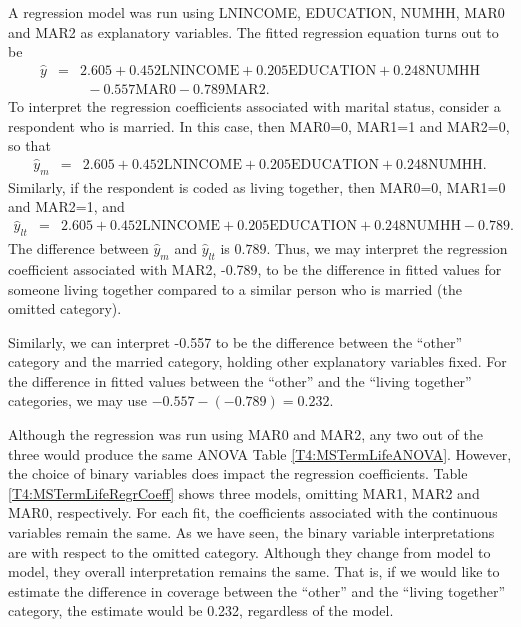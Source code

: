 A regression model was run using LNINCOME, EDUCATION, NUMHH, MAR0
and MAR2 as explanatory variables. The fitted regression equation
turns out to be
\begin{eqnarray*}
\widehat{y} &=& 2.605 + 0.452 \textrm{LNINCOME} +0.205
\textrm{EDUCATION} + 0.248 \textrm{NUMHH} \\
 & & ~~ -0.557 \textrm{MAR0} -0.789 \textrm{MAR2}.
\end{eqnarray*}
To interpret the regression coefficients associated with marital
status, consider a respondent who is married. In this case, then
MAR0=0, MAR1=1 and MAR2=0, so that
\begin{eqnarray*}
\widehat{y}_m &=& 2.605 + 0.452 \textrm{LNINCOME} +0.205
\textrm{EDUCATION} + 0.248 \textrm{NUMHH} .
\end{eqnarray*}
Similarly, if the respondent is coded as living together, then
MAR0=0, MAR1=0 and MAR2=1, and
   \begin{eqnarray*}
\widehat{y}_{lt} &=& 2.605 + 0.452 \textrm{LNINCOME} +0.205
\textrm{EDUCATION} + 0.248 \textrm{NUMHH} -0.789.
\end{eqnarray*}
The difference between $\widehat{y}_m$ and $\widehat{y}_{lt}$ is
$0.789.$ Thus, we may interpret the regression coefficient
associated with MAR2, -0.789, to be the difference in fitted values
for someone living together compared to a similar person who is
married (the omitted category).

Similarly, we can interpret -0.557 to be the difference between the
``other'' category and the married category, holding other
explanatory variables fixed. For the difference in fitted values
between the ``other'' and the ``living together'' categories, we may
use $-0.557 - (-0.789) = 0.232.$

Although the regression was run using MAR0 and MAR2, any two out of
the three would produce the same ANOVA Table
\ref{T4:MSTermLifeANOVA}. However, the choice of binary variables
does impact the regression coefficients. Table
\ref{T4:MSTermLifeRegrCoeff} shows three models, omitting MAR1, MAR2
and MAR0, respectively. For each fit, the coefficients associated
with the continuous variables remain the same. As we have seen, the
binary variable interpretations are with respect to the omitted
category. Although they change from model to model, they overall
interpretation remains the same. That is, if we would like to
estimate the difference in coverage between the ``other'' and the
``living together'' category, the estimate would be 0.232,
regardless of the model.

